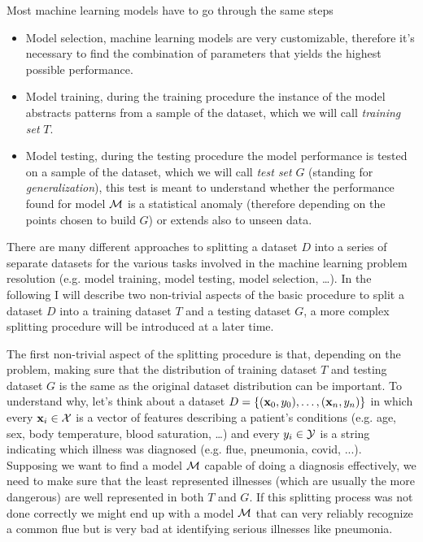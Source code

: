 Most machine learning models have to go through the same steps
\begin{itemize}
	\item Model selection, machine learning models are very customizable, therefore it's
	      necessary to find the combination of parameters that yields the highest possible
	      performance.
	\item Model training, during the training procedure the instance of the model abstracts
	      patterns from a sample of the dataset, which we will call \emph{training set} $T$.
	\item Model testing, during the testing procedure the model performance is tested on a
	      sample of the dataset, which we will call \emph{test set} $G$ (standing for \emph{generalization}),
	      this test is meant to understand whether the performance found for model
	      $\mathcal{M}$ is a statistical anomaly (therefore depending on the points
	      chosen to build $G$) or extends also to unseen data.
\end{itemize}

There are many different approaches to splitting a dataset $D$ into a series of separate datasets
for the various tasks involved in the machine learning problem resolution (e.g. model training,
model testing, model selection, \ldots). In the following I will describe two non-trivial aspects of
the basic procedure to split a dataset $D$ into a training dataset $T$ and a testing dataset $G$, a
more complex splitting procedure will be introduced at a later time.

\medskip

The first non-trivial aspect of the splitting procedure is that, depending on the problem, making
sure that the distribution of training dataset $T$ and testing dataset $G$ is the same as the
original dataset distribution can be important. To understand why, let's think about a dataset
$D = \{(\mathbf{x}_0, y_0), \ldots, (\mathbf{x}_n, y_n)\}$ in which every $\mathbf{x}_i \in \mathcal{X}$ is a vector of features describing a patient's
conditions (e.g. age, sex, body temperature, blood saturation, \ldots) and every $y_i \in \mathcal{Y}$ is
a string indicating which illness was diagnosed (e.g. flue, pneumonia, covid, ...). Supposing we want to find a
model $\mathcal{M}$ capable of doing a diagnosis effectively, we need to make sure that the least
represented illnesses (which are usually the more dangerous) are well represented in both $T$ and $G$. If this splitting process was not done correctly we might end up with a model $\mathcal{M}$ that can very reliably recognize a common flue but is very bad at identifying serious illnesses like pneumonia.

